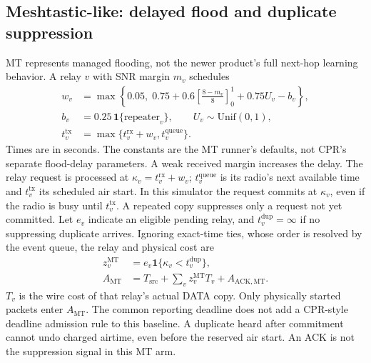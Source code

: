\documentclass[conference,letterpaper,10pt]{IEEEtran}
\begin{document}
\subsection{Meshtastic-like: delayed flood and duplicate suppression}
MT represents managed flooding, not the newer product's full next-hop
learning behavior. A relay $v$ with SNR margin $m_v$ schedules
\begin{equation}
\begin{aligned}
w_v&=\max\!\left\{0.05,\;0.75+
  0.6\left[\frac{8-m_v}{8}\right]_0^1+0.75U_v-b_v\right\},\\
b_v&=0.25\,\mathbf 1\{\mathrm{repeater}_v\},\qquad
U_v\sim\mathrm{Unif}(0,1),\\
t_v^{\mathrm{tx}}&=\max\{t_v^{\mathrm{rx}}+w_v,t_v^{\mathrm{queue}}\}.
\end{aligned}
\label{eq:meshtastic-delay}
\end{equation}
Times are in seconds. The constants are the MT runner's defaults, not
CPR's separate flood-delay parameters. A weak received margin increases the
delay. The relay request is processed at $\kappa_v=t_v^{\mathrm{rx}}+w_v$;
$t_v^{\mathrm{queue}}$ is its radio's next available time and
$t_v^{\mathrm{tx}}$ its scheduled air start. In this simulator the request
commits at $\kappa_v$, even if the radio is busy until $t_v^{\mathrm{tx}}$.
A repeated copy suppresses only a request not yet committed.
Let $e_v$ indicate an eligible pending relay, and $t_v^{\mathrm{dup}}=\infty$
if no suppressing duplicate arrives. Ignoring exact-time ties, whose order is
resolved by the event queue, the relay and physical cost are
\begin{equation}
\begin{aligned}
z_v^{\mathrm{MT}}&=e_v\mathbf 1\{\kappa_v<t_v^{\mathrm{dup}}\},\\
A_{\mathrm{MT}}&=T_{\mathrm{src}}+
 \sum_vz_v^{\mathrm{MT}}T_v+A_{\mathrm{ACK,MT}}.
\end{aligned}
\label{eq:meshtastic-cost}
\end{equation}
$T_v$ is the wire cost of that relay's actual DATA copy. Only physically
started packets enter $A_{\mathrm{MT}}$. The common reporting deadline does
not add a CPR-style deadline admission rule to this baseline.
A duplicate heard after commitment cannot undo charged airtime, even before
the reserved air start. An ACK is not the suppression signal in this MT arm.
\end{document}
